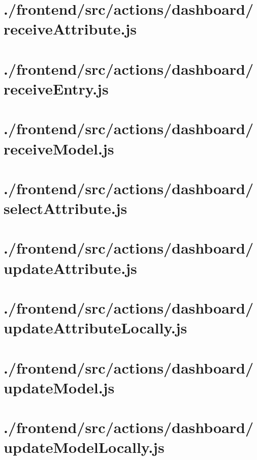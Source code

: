 \documentclass[11pt]{informatics-report}
\begin{document}
\newpage
\section{./frontend/src/actions/dashboard/receiveAttribute.js}


\newpage
\section{./frontend/src/actions/dashboard/receiveEntry.js}


\newpage
\section{./frontend/src/actions/dashboard/receiveModel.js}


\newpage
\section{./frontend/src/actions/dashboard/selectAttribute.js}


\newpage
\section{./frontend/src/actions/dashboard/updateAttribute.js}


\newpage
\section{./frontend/src/actions/dashboard/updateAttributeLocally.js}


\newpage
\section{./frontend/src/actions/dashboard/updateModel.js}


\newpage
\section{./frontend/src/actions/dashboard/updateModelLocally.js}

\end{document}
